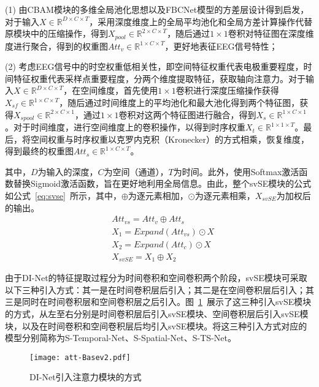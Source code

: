 (1) 由CBAM模块的多维全局池化思想以及FBCNet模型的方差层设计\cite{mane2021fbcnet}得到启发，对于输入\(X \in \mathbb{R}^{D \times C \times T}\)，采用深度维度上的全局平均池化和全局方差计算操作代替原模块中的压缩操作，得到\(X_{pool} \in \mathbb{R}^{2 \times C \times T}\)，随后通过\(1\times1\)卷积对特征图在深度维度进行聚合，得到的权重图\(Att_v \in \mathbb{R}^{1 \times C \times T}\)，更好地表征EEG信号特性；

(2) 考虑EEG信号中的时空权重低相关性，即空间特征权重代表电极重要程度，时间特征权重代表采样点重要程度，分两个维度提取特征，获取轴向注意力。对于输入\(X \in \mathbb{R}^{D \times C \times T}\)，在空间维度，首先使用\(1\times1\)卷积进行深度压缩操作获得\(X_{sf} \in \mathbb{R}^{1 \times C \times T}\)，随后通过时间维度上的平均池化和最大池化得到两个特征图，获得\(X_{spool} \in \mathbb{R}^{2 \times C \times 1}\)，通过\(1\times1\)卷积对这两个特征图进行融合，得到\(X_s \in \mathbb{R}^{1 \times C \times 1}\)。对于时间维度，进行空间维度上的卷积操作，以得到时序权重\(X_t \in \mathbb{R}^{1 \times 1 \times T}\)。最后，将空间权重与时序权重以克罗内克积（Kronecker）的方式相乘，恢复维度，得到最终的权重图\(Att_s \in \mathbb{R}^{1 \times C \times T}\)。

其中，\(D\)为输入的深度，\(C\)为空间（通道），\(T\)为时间。此外，使用Softmax激活函数替换Sigmoid激活函数，旨在更好地利用全局信息。由此，整个svSE模块的公式如公式~\ref{eq:svse}~所示，其中，\(\oplus\)为逐元素相加，\(\odot\)为逐元素相乘，\(X_{svSE}\)为加权后的输出。
\begin{equation}\label{eq:svse}
    \begin{aligned}
        &Att_{vs}=Att_v \oplus Att_s \\
        &X_1=Expand(Att_{vs}) \odot X \\
        &X_2=Expand(Att_c) \odot X \\
        &X_{svSE}=X_1 \oplus X_2
    \end{aligned}
\end{equation}

由于DI-Net的特征提取过程分为时间卷积和空间卷积两个阶段，svSE模块可采取以下三种引入方式：其一是在时间卷积层后引入；其二是在空间卷积层后引入；其三是同时在时间卷积层和空间卷积层之后引入。图~\ref{fig:att-Base}~展示了这三种引入svSE模块的方式，从左至右分别是时间卷积层后引入svSE模块、空间卷积层后引入svSE模块，以及在时间卷积和空间卷积层后均引入svSE模块。将这三种引入方式对应的模型分别简称为S-Temporal-Net、S-Spatial-Net、S-TS-Net。
\begin{figure}
  \centering
  \texttt{[image: att-Basev2.pdf]}
  \caption{DI-Net引入注意力模块的方式}
  \label{fig:att-Base}
\end{figure}

